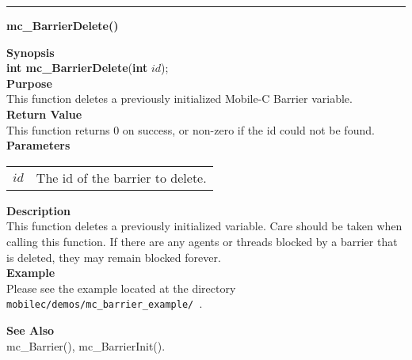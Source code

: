\noindent
\vspace{5pt}
\rule{6.5in}{0.015in}
\noindent
{}
{\LARGE \bf mc\_BarrierDelete()}\\
\label{api:mc_BarrierDelete()}

\noindent
{\bf Synopsis}\\
{\bf int mc\_BarrierDelete}({\bf int} $id$);\\

\noindent
{\bf Purpose}\\
This function deletes a previously initialized Mobile-C Barrier variable.
 \\

\noindent
{\bf Return Value}\\
This function returns 0 on success, or non-zero if the id could not be found. \\

\noindent
{\bf Parameters}
\vspace{-0.1pt}
\begin{description}
\item
\begin{tabular}{p{10 mm}p{145 mm}} 
$id$ & The id of the barrier to delete. 
\end{tabular}
\end{description}

\noindent
{\bf Description}\\
This function deletes a previously initialized variable. Care should be taken
when calling this function. If there are any agents or threads blocked
by a barrier that is deleted, they may remain blocked forever.
    \\

\noindent
{\bf Example}\\
Please see the example located at the directory
\texttt{ mobilec/demos/mc\_barrier\_example/ }. \\

\noindent

\noindent
{\bf See Also}\\
mc\_Barrier(), mc\_BarrierInit(). \\

